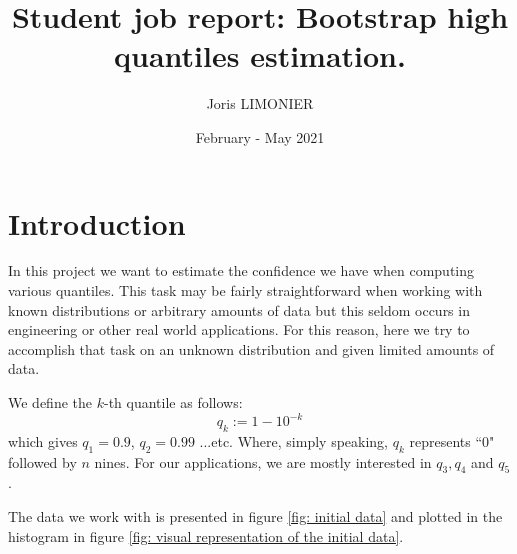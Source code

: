 \documentclass{article}
\title{Student job report: Bootstrap high quantiles estimation.}
\author{Joris LIMONIER}
\date{February - May 2021}
\begin{document}
\maketitle

\newpage
\tableofcontents
\listoffigures
\newpage

\section{Introduction}
In this project we want to estimate the confidence we have when computing various quantiles. This task may be fairly straightforward when working with known distributions or arbitrary amounts of data but this seldom occurs in engineering or other real world applications. For this reason, here we try to accomplish that task on an unknown distribution and given limited amounts of data.

We define the \(k\)-th quantile as follows:
\begin{equation}
    q_k := 1 - 10^{-k}
\end{equation}
which gives $q_1 = 0.9$, $q_2 = 0.99$ ...etc. Where, simply speaking, $q_k$ represents ``0" followed by $n$ nines. For our applications, we are mostly interested in $q_3, q_4$ and $q_5$.

The data we work with is presented in figure \ref{fig: initial data} and plotted in the histogram in figure \ref{fig: visual representation of the initial data}.
\end{document}
